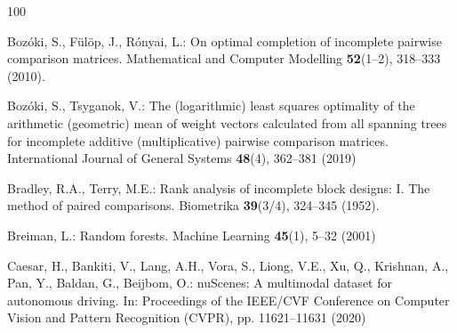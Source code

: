 \documentclass[graybox,envcountchap]{style/SNmono}
\begin{document}
\begin{thebibliography}{100}

Boz{\'o}ki, S., F{\"u}l{\"o}p, J., R{\'o}nyai, L.: On optimal completion of
  incomplete pairwise comparison matrices.
\newblock Mathematical and Computer Modelling \textbf{52}(1--2), 318--333
  (2010).
\newblock {}


{\color{red} 
Boz{\'o}ki, S., Tsyganok, V.: The (logarithmic) least squares optimality of the
  arithmetic (geometric) mean of weight vectors calculated from all spanning
  trees for incomplete additive (multiplicative) pairwise comparison matrices.
\newblock International Journal of General Systems \textbf{48}(4), 362--381
  (2019)

\par}

Bradley, R.A., Terry, M.E.: Rank analysis of incomplete block designs: {I}.
  {T}he method of paired comparisons.
\newblock Biometrika \textbf{39}(3/4), 324--345 (1952).
\newblock {}


{\color{red} 
Breiman, L.: Random forests.
\newblock Machine Learning \textbf{45}(1), 5--32 (2001)

\par}
{\color{red} 
Caesar, H., Bankiti, V., Lang, A.H., Vora, S., Liong, V.E., Xu, Q., Krishnan,
  A., Pan, Y., Baldan, G., Beijbom, O.: {nuScenes}: A multimodal dataset for
  autonomous driving.
\newblock In: Proceedings of the IEEE/CVF Conference on Computer Vision and
  Pattern Recognition (CVPR), pp. 11621--11631 (2020)

\par}
\end{thebibliography}
\end{document}
